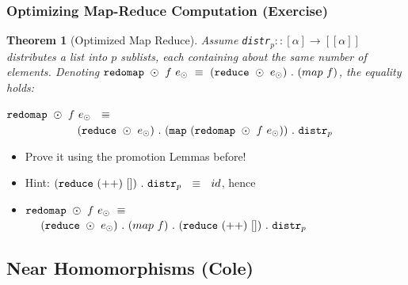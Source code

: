 \documentclass{beamer}
\renewcommand{\emph}[1]{\textcolor{structure}{#1}}
\newcommand{\emp}[1]{\textcolor{DikuRed}{ #1}}
\newtheorem{mytheo}{Theorem}
\begin{document}
\begin{frame}[fragile,t]
  \frametitle{Optimizing Map-Reduce Computation (\alert{Exercise})}

\begin{mytheo}[Optimized Map Reduce]\label{MapRed}
Assume {\tt distr$_p :: [\alpha] \rightarrow [[\alpha]]$}
distributes a list into $p$ sublists, each containing about 
the same number of elements. Denoting  
${\tt redomap }\ \odot \ f \ e_{\odot} \ \equiv \ ({\tt reduce} \ \odot \ e_{\odot}) \ . \ (map \ f)$, the equality holds:\\\bigskip

\emp{${\tt redomap} \ \odot \ f \ e_{\odot} \ \ \equiv$}\\
\emp{$\ \ \ \ \ \ \ \ \ \ \ \ \ \ \ \ \ \ \ ({\tt reduce} \ \odot \ e_{\odot}) \ . \ ({\tt map} \ ({\tt redomap} \ \odot \ f \ e_{\odot})) \ . \ {\tt distr}_p$}
\end{mytheo}

\begin{itemize}
    \item \alert{Prove it using the promotion Lemmas before!}
    \item \emph{Hint: $({\tt reduce} \ (++) \ []) \ . \ {\tt distr}_p \ \ \equiv \ \ id$, hence}
    \item \emph{${\tt redomap }\ \odot \ f \ e_{\odot} \ \equiv$\\ $\ \ \ \ ({\tt reduce} \ \odot \ e_{\odot}) \ . \ (map \ f) \ . \ ({\tt reduce} \ (++) \ []) \ . \ {\tt distr}_p$}
\end  {itemize}

\end{frame}


\subsection{Near Homomorphisms (Cole)}

\begin{frame}[fragile]
	\tableofcontents[currentsubsection]
\end{frame}
\end{document}
